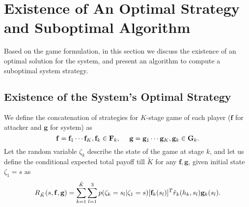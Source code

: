 \section{Existence of An Optimal Strategy and Suboptimal Algorithm}

Based on the game formulation, in this section we discuss the existence of an optimal solution for the system, and present an algorithm to compute a suboptimal system strategy.%
 
\subsection{Existence of the System's Optimal Strategy}

We define the concatenation of strategies for $K$-stage game of each player ($\mathbf{f}$ for attacker and $\mathbf{g}$ for system) as%
\vspace{-4.5pt}
\begin{equation*}
\vspace{-4.5pt}
\mathbf{f}=\mathbf{f}_1\cdots \mathbf{f}_K,\mathbf{f}_{k} \in \mathbf{F}_{k},
~~~~\mathbf{g}=\mathbf{g}_{1}\cdots\mathbf{g}_K,\mathbf{g}_{k} \in \mathbf{G}_{k}.
\end{equation*}
Let the random variable $\zeta_{k}$ describe the state of the game at stage $k$, and  
let us define the conditional expected total payoff till $\tilde{K}$ for any $\mathbf{f},\mathbf{g}$, given initial state $\zeta_{1}=s$ as%
\footnotesize
\begin{equation*}\vspace{-5pt}
R_{\tilde{K}}(s, \mathbf{f}, \mathbf{g})%
=\sum \limits^{\tilde{K}}_{k=1}\sum_{l=1}^{3} p(\zeta_{k}=s_{l}|\zeta_{1} = s)[\mathbf{f}_{k}(s_{l})]^{T}\tilde{r}_{k}(h_{k},s_{l})\mathbf{g}_{k}(s_{l}).
\end{equation*}
